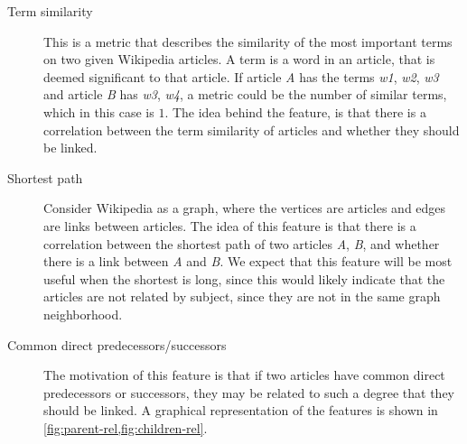 \begin{description}
    \item[Term similarity] This is a metric that describes the similarity of the most important terms on two given Wikipedia articles. A term is a word in an article, that is deemed significant to that article. If article \emph{A} has the terms \emph{w1}, \emph{w2}, \emph{w3} and article \emph{B} has \emph{w3}, \emph{w4}, a metric could be the number of similar terms, which in this case is $1$. The idea behind the feature, is that there is a correlation between the term similarity of articles and whether they should be linked.
    \item[Shortest path] Consider Wikipedia as a graph, where the vertices are articles and edges are links between articles. The idea of this feature is that there is a correlation between the shortest path of two articles \emph{A}, \emph{B}, and whether there is a link between \emph{A} and \emph{B}. We expect that this feature will be most useful when the shortest is long, since this would likely indicate that the articles are not related by subject, since they are not in the same graph neighborhood.
    \item[Common direct predecessors/successors] The motivation of this feature is that if two articles have common direct predecessors or successors, they may be related to such a degree that they should be linked. A graphical representation of the features is shown in \cref{fig:parent-rel,fig:children-rel}.
\end{description}

